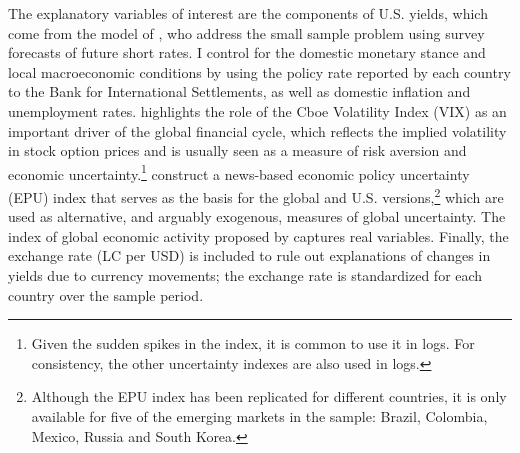 {The explanatory variables of interest are the components of U.S. yields, which come from the model of \cite{KimWright:2005}, who address the small sample problem using survey forecasts of future short rates. 
I control for the domestic monetary stance and local macroeconomic conditions by using the policy rate reported by each country to the Bank for International Settlements, as well as domestic inflation and unemployment rates. 
\cite{Rey:2013} highlights the role of the Cboe Volatility Index (VIX) as an important driver of the global financial cycle, which reflects the implied volatility in stock option prices and is usually seen as a measure of risk aversion and economic uncertainty.\footnote{ Given the sudden spikes in the index, it is common to use it in logs. For consistency, the other uncertainty indexes are also used in logs.}
\cite{BakerBloomDavis:2016} construct a news-based economic policy uncertainty (EPU) index that serves as the basis for the global and U.S. versions,\footnote{ Although the EPU index has been replicated for different countries, it is only available for five of the emerging markets in the sample: Brazil, Colombia, Mexico, Russia and South Korea.} which are used as alternative, and arguably exogenous, measures of global uncertainty.
The index of global economic activity proposed by \cite{Hamilton:2021} captures real variables. 
Finally, the exchange rate (LC per USD) is included to rule out explanations of changes in yields due to currency movements; the exchange rate is standardized for each country over the sample period.

}
